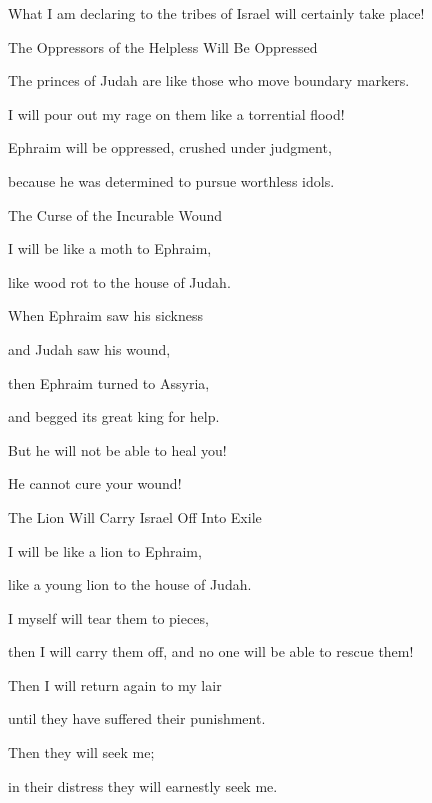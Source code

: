 {\par }{\Q What I am declaring
to the tribes
of Israel
will certainly take place!
\par }{\SH The Oppressors of the Helpless Will Be Oppressed
\par }{\Q {}The princes
of Judah
are like those who move
boundary markers.
\par }{\Q I will pour
out my rage
on them like a torrential flood!
\par }{\Q {}Ephraim
will be oppressed,
crushed
under judgment,
\par }{\Q because
he was determined
to pursue
worthless idols.
\par }{\SH The Curse of the Incurable Wound
\par }{\Q {}I
will be like a moth
to Ephraim,
\par }{\Q like wood rot
to the house
of Judah.
\par }{\Q {}When Ephraim
saw
his sickness
\par }{\Q and Judah
saw his wound,
\par }{\Q then
Ephraim
turned to
Assyria,
\par }{\Q and begged
its great king
for
help.
\par }{\Q But he
will not
be able
to heal
you!
\par }{\Q He cannot
cure
your wound!
\par }{\SH The Lion Will Carry Israel Off Into Exile
\par }{\Q {}I
will be like a lion
to Ephraim,
\par }{\Q like a young lion
to the house
of Judah.
\par }{\Q I
myself
will tear
them to pieces,
\par }{\Q then
I will carry
them off, and no
one will be able to rescue them!
\par }{\Q {}Then
I will return
again to
my lair
\par }{\Q until
they have
suffered their punishment.
\par }{\Q Then
they will seek
me;

\par }{\Q in their distress
they
will earnestly seek me.

\par }
